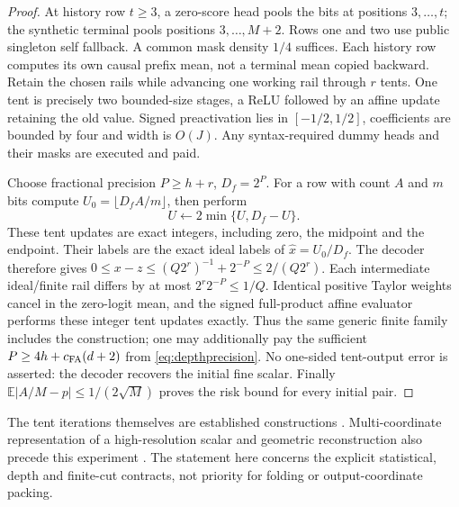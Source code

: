\documentclass[11pt,letterpaper]{article}
\theoremstyle{definition}\newtheorem{definition}[theorem]{Definition}
\theoremstyle{remark}\newtheorem{remark}[theorem]{Remark}
\newcommand{\E}{\mathbb{E}}
\begin{document}
\begin{proof}
At history row $t\ge3$, a zero-score head pools the bits at positions $3,\ldots,t$; the synthetic terminal pools positions $3,\ldots,M+2$. Rows one and two use public singleton self fallback. A common mask density $1/4$ suffices. Each history row computes its own causal prefix mean, not a terminal mean copied backward. Retain the chosen rails while advancing one working rail through $r$ tents. One tent is precisely two bounded-size stages, a ReLU followed by an affine update retaining the old value. Signed preactivation lies in $[-1/2,1/2]$, coefficients are bounded by four and width is $O(J)$. Any syntax-required dummy heads and their masks are executed and paid.

Choose fractional precision $P\ge h+r$, $D_f=2^P$. For a row with count $A$ and $m$ bits compute $U_0=\lfloor D_fA/m\rfloor$, then perform
\[
 U\longleftarrow2\min\{U,D_f-U\}.
\]
These tent updates are exact integers, including zero, the midpoint and the endpoint. Their labels are the exact ideal labels of $\widehat x=U_0/D_f$. The decoder therefore gives
$0\le x-z\le(Q2^r)^{-1}+2^{-P}\le2/(Q2^r)$.
Each intermediate ideal/finite rail differs by at most $2^r2^{-P}\le1/Q$. Identical positive Taylor weights cancel in the zero-logit mean, and the signed full-product affine evaluator performs these integer tent updates exactly. Thus the same generic finite family includes the construction; one may additionally pay the sufficient $P\ge4h+c_{\rm FA}(d+2)$ from \eqref{eq:depthprecision}. No one-sided tent-output error is asserted: the decoder recovers the initial fine scalar. Finally $\E|A/M-p|\le1/(2\sqrt M)$ proves the risk bound for every initial pair.
\end{proof}

The tent iterations themselves are established constructions \citep[Section 3.3]{telgarsky2016}. Multi-coordinate representation of a high-resolution scalar and geometric reconstruction also precede this experiment \citep[Sections 2.1--2.4 of the cited version]{uss2025}. The statement here concerns the explicit statistical, depth and finite-cut contracts, not priority for folding or output-coordinate packing.
\end{document}
